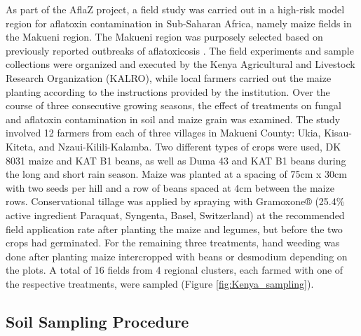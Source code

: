 \begin{refsection}
As part of the AflaZ project, a field study was carried out in a high-risk model region for aflatoxin contamination in Sub-Saharan Africa, namely maize fields in the Makueni region. The Makueni region was purposely selected based on previously reported outbreaks of aflatoxicosis \citep{lewis2005aflatoxin}. The field experiments and sample collections were organized and executed by the Kenya Agricultural and Livestock Research Organization (KALRO), while local farmers carried out the maize planting according to the instructions provided by the institution. Over the course of three consecutive growing seasons, the effect of treatments on fungal and aflatoxin contamination in soil and maize grain was examined. The study involved 12 farmers from each of three villages in Makueni County: Ukia, Kisau-Kiteta, and Nzaui-Kilili-Kalamba. Two different types of crops were used, DK 8031 maize and KAT B1 beans, as well as Duma 43 and KAT B1 beans during the long and short rain season. Maize was planted at a spacing of 75cm x 30cm with two seeds per hill and a row of beans spaced at 4cm between the maize rows. Conservational tillage was applied by spraying with Gramoxone® (25.4\% active ingredient Paraquat, Syngenta, Basel, Switzerland) at the recommended field application rate after planting the maize and legumes, but before the two crops had germinated. For the remaining three treatments, hand weeding was done after planting maize intercropped with beans or desmodium depending on the plots. A total of 16 fields from 4 regional clusters, each farmed with one of the respective treatments, were sampled (Figure \ref{fig:Kenya_sampling}).

\subsection{Soil Sampling Procedure}


\end{refsection}
